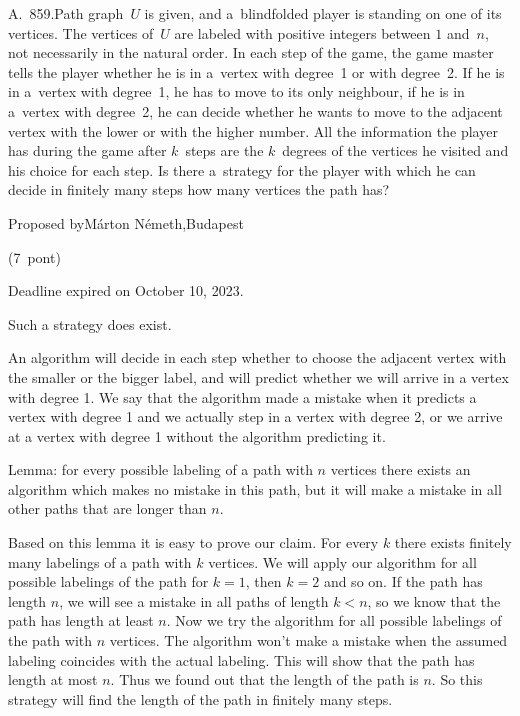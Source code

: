 \documentclass{article}
\begin{document}
	A. 859.Path graph \(\displaystyle U\) is given, and a blindfolded player is standing on one of its vertices. The vertices of \(\displaystyle U\) are labeled with positive integers between \(\displaystyle 1\) and \(\displaystyle n\), not necessarily in the natural order. In each step of the game, the game master tells the player whether he is in a vertex with degree 1 or with degree 2. If he is in a vertex with degree 1, he has to move to its only neighbour, if he is in a vertex with degree 2, he can decide whether he wants to move to the adjacent vertex with the lower or with the higher number. All the information the player has during the game after \(\displaystyle k\) steps are the \(\displaystyle k\) degrees of the vertices he visited and his choice for each step. Is there a strategy for the player with which he can decide in finitely many steps how many vertices the path has?
	
	Proposed byMárton Németh,Budapest
	
	(7 pont)
	
	Deadline expired on October 10, 2023.
	
	Such a strategy does exist.
	
	An algorithm will decide in each step whether to choose the adjacent vertex with the smaller or the bigger label, and will predict whether we will arrive in a vertex with degree 1. We say that the algorithm made a mistake when it predicts a vertex with degree 1 and we actually step in a vertex with degree 2, or we arrive at a vertex with degree 1 without the algorithm predicting it.
	
	Lemma: for every possible labeling of a path with \(\displaystyle n\) vertices there exists an algorithm which makes no mistake in this path, but it will make a mistake in all other paths that are longer than \(\displaystyle n\).
	
	Based on this lemma it is easy to prove our claim. For every \(\displaystyle k\) there exists finitely many labelings of a path with \(\displaystyle k\) vertices. We will apply our algorithm for all possible labelings of the path for \(\displaystyle k=1\), then \(\displaystyle k=2\) and so on. If the path has length \(\displaystyle n\), we will see a mistake in all paths of length \(\displaystyle k<n\), so we know that the path has length at least \(\displaystyle n\). Now we try the algorithm for all possible labelings of the path with \(\displaystyle n\) vertices. The algorithm won't make a mistake when the assumed labeling coincides with the actual labeling. This will show that the path has length at most \(\displaystyle n\). Thus we found out that the length of the path is \(\displaystyle n\). So this strategy will find the length of the path in finitely many steps.
	
\end{document}
